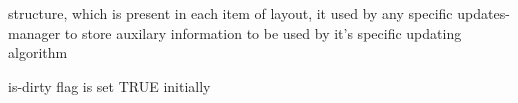 %
%


\section{}\label{cbupdatemgrdata}


structure, which is present in each item of layout,
   it used by any specific updates-manager to store
   auxilary information to be used by it's specific
   updating algorithm
 





\label{cbupdatemgrdatacbupdatemgrdata}


is-dirty flag is set TRUE initially


\label{cbupdatemgrdataisdirty}



\label{cbupdatemgrdatasetcustomdata}



\label{cbupdatemgrdatasetdirty}



\label{cbupdatemgrdatastoreitemstate}


